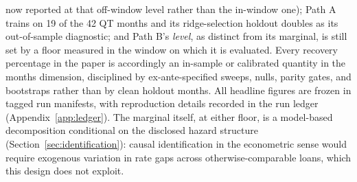 \documentclass[12pt]{article}
\begin{document}
now reported at that off-window level rather than the in-window one); Path A trains on 19 of the 42 QT months and its ridge-selection holdout doubles as its out-of-sample diagnostic; and Path B's \emph{level}, as distinct from its marginal, is still set by a floor measured in the window on which it is evaluated. Every recovery percentage in the paper is accordingly an in-sample or calibrated quantity in the months dimension, disciplined by ex-ante-specified sweeps, nulls, parity gates, and bootstraps rather than by clean holdout months. All headline figures are frozen in tagged run manifests, with reproduction details recorded in the run ledger (Appendix~\ref{app:ledger}). The marginal itself, at either floor, is a model-based decomposition conditional on the disclosed hazard structure (Section~\ref{sec:identification}): causal identification in the econometric sense would require exogenous variation in rate gaps across otherwise-comparable loans, which this design does not exploit.
\end{document}
